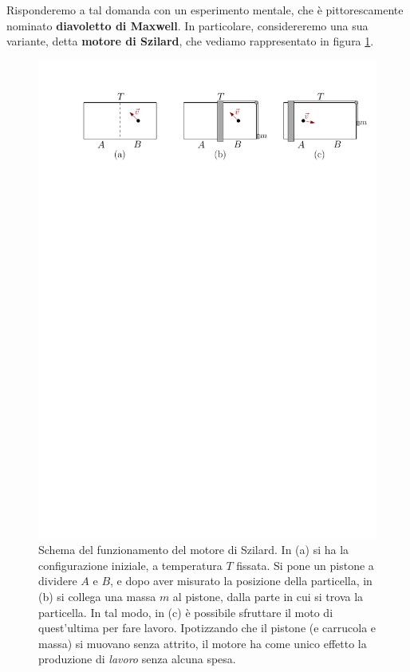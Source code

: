 \documentclass[../../InformazioneQuantistica.tex]{subfiles}
\begin{document}
Risponderemo a tal domanda con un esperimento mentale, che è pittorescamente nominato \textbf{diavoletto di Maxwell}. In particolare, considereremo una sua variante, detta \textbf{motore di Szilard}, che vediamo rappresentato in figura \ref{fig:szilard}.

\begin{figure}[t]
\centering
\includegraphics[scale=0.8]{Immagini/27_2/Svilards_engine.pdf}
\caption{Schema del funzionamento del motore di Szilard. In (a) si ha la configurazione iniziale, a temperatura $T$ fissata. Si pone un pistone a dividere $A$ e $B$, e dopo aver misurato la posizione della particella, in (b) si collega una massa $m$ al pistone, dalla parte in cui si trova la particella. In tal modo, in (c) è possibile sfruttare il moto di quest'ultima per fare lavoro. Ipotizzando che il pistone (e carrucola e massa) si muovano senza attrito, il motore ha come unico effetto la produzione di \textit{lavoro} senza alcuna spesa.\label{fig:szilard}}
\end{figure}
\end{document}
